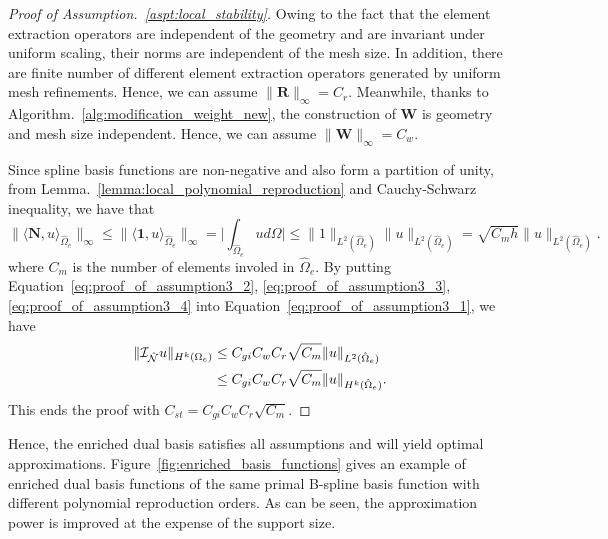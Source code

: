 \begin{proof}[Proof of Assumption.~\ref{aspt:local_stability}]
	Owing to the fact that the \Bezier element extraction operators are independent of the geometry and are invariant under uniform scaling, their norms are independent of the mesh size. In addition, there are finite number of different \Bezier element extraction operators generated by uniform mesh refinements. Hence, we can assume $\|\mathbf{R}\|_\infty=C_r$. Meanwhile, thanks to Algorithm.~\ref{alg:modification_weight_new}, the construction of $\mathbf{W}$ is geometry and mesh size independent. Hence, we can assume $\|\mathbf{W}\|_\infty=C_w$.\par

	Since spline basis functions are non-negative and also form a partition of unity, from Lemma.~\ref{lemma:local_polynomial_reproduction} and Cauchy-Schwarz inequality, we have that
	\begin{equation}
		\| \langle {\mathbf{N},u} \rangle_{\hat{\Omega}_e} \|_\infty \leq \| \langle {\mathbf{1},u} \rangle_{\hat{\Omega}_e} \|_\infty = \vert \int_{\hat{\Omega}_e} u d\Omega \vert \leq \|1\|_{L^2(\hat{\Omega}_e)} \|u\|_{L^2(\hat{\Omega}_e)}=\sqrt{C_m h} \|u\|_{L^2(\hat{\Omega}_e)}.\label{eq:proof_of_assumption3_4}
	\end{equation}
	where $C_m$ is the number of elements involed in $\hat{\Omega}_e$. By putting Equation~\eqref{eq:proof_of_assumption3_2}, \eqref{eq:proof_of_assumption3_3}, \eqref{eq:proof_of_assumption3_4} into Equation~\eqref{eq:proof_of_assumption3_1}, we have
	\begin{equation}
		\begin{split}
			\| \mathcal{I}_{\hat{\mathcal{N}}}u \|_{H^k(\Omega_e)} &\leq C_{gi}C_wC_r \sqrt{C_m} \|u\|_{L^2(\hat{\Omega}_e)} \\
			&\leq C_{gi}C_wC_r\sqrt{C_m}\|u\|_{H^k(\hat{\Omega}_e)}.
		\end{split}
	\end{equation}
	This ends the proof with $C_{st}=C_{gi}C_wC_r\sqrt{C_m}$.
\end{proof}
Hence, the enriched dual basis satisfies all assumptions and will yield optimal approximations. Figure~\ref{fig:enriched_basis_functions} gives an example of enriched \Bezier dual basis functions of the same primal B-spline basis function with different polynomial reproduction orders. As can be seen, the approximation power is improved at the expense of the support size.

